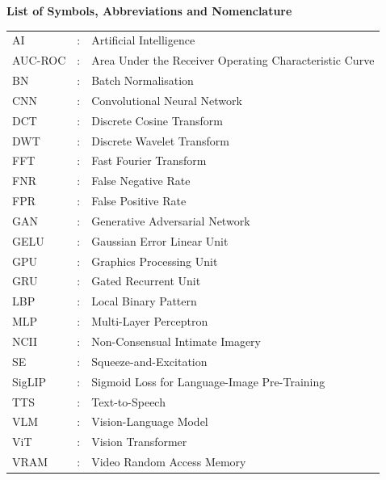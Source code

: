 \thispagestyle{plain}
\begin{center}
	{\Large \bf List of Symbols, Abbreviations and Nomenclature }
\end{center}

\begin{longtable}{L{.15\linewidth}cL{.65\linewidth}}
	AI      & : & Artificial Intelligence \\
	AUC-ROC & : & Area Under the Receiver Operating Characteristic Curve \\
	BN      & : & Batch Normalisation \\
	CNN     & : & Convolutional Neural Network \\
	DCT     & : & Discrete Cosine Transform \\
	DWT     & : & Discrete Wavelet Transform \\
	FFT     & : & Fast Fourier Transform \\
	FNR     & : & False Negative Rate \\
	FPR     & : & False Positive Rate \\
	GAN     & : & Generative Adversarial Network \\
	GELU    & : & Gaussian Error Linear Unit \\
	GPU     & : & Graphics Processing Unit \\
	GRU     & : & Gated Recurrent Unit \\
	LBP     & : & Local Binary Pattern \\
	MLP     & : & Multi-Layer Perceptron \\
	NCII    & : & Non-Consensual Intimate Imagery \\
	SE      & : & Squeeze-and-Excitation \\
	SigLIP  & : & Sigmoid Loss for Language-Image Pre-Training \\
	TTS     & : & Text-to-Speech \\
	VLM     & : & Vision-Language Model \\
	ViT     & : & Vision Transformer \\
	VRAM    & : & Video Random Access Memory \\
\end{longtable}
